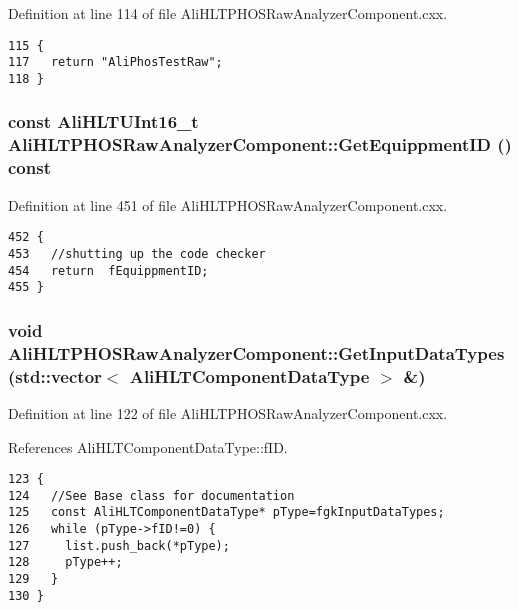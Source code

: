 Definition at line 114 of file Ali\-HLTPHOSRaw\-Analyzer\-Component.cxx.

\footnotesize\begin{verbatim}115 {
117   return "AliPhosTestRaw";
118 }
\end{verbatim}\normalsize 


\subsubsection{\setlength{\rightskip}{0pt plus 5cm}const {\bf Ali\-HLTUInt16\_\-t} Ali\-HLTPHOSRaw\-Analyzer\-Component::Get\-Equippment\-ID () const}\label{classAliHLTPHOSRawAnalyzerComponent_a10}




Definition at line 451 of file Ali\-HLTPHOSRaw\-Analyzer\-Component.cxx.

\footnotesize\begin{verbatim}452 {
453   //shutting up the code checker
454   return  fEquippmentID;
455 }
\end{verbatim}\normalsize 


\subsubsection{\setlength{\rightskip}{0pt plus 5cm}void Ali\-HLTPHOSRaw\-Analyzer\-Component::Get\-Input\-Data\-Types (std::vector$<$ {\bf Ali\-HLTComponent\-Data\-Type} $>$ \&)\hspace{0.3cm}{\tt  [virtual]}}\label{classAliHLTPHOSRawAnalyzerComponent_a13}




Definition at line 122 of file Ali\-HLTPHOSRaw\-Analyzer\-Component.cxx.

References Ali\-HLTComponent\-Data\-Type::f\-ID.

\footnotesize\begin{verbatim}123 {
124   //See Base class for documentation
125   const AliHLTComponentDataType* pType=fgkInputDataTypes;
126   while (pType->fID!=0) {
127     list.push_back(*pType);
128     pType++;
129   }
130 }
\end{verbatim}\normalsize 


